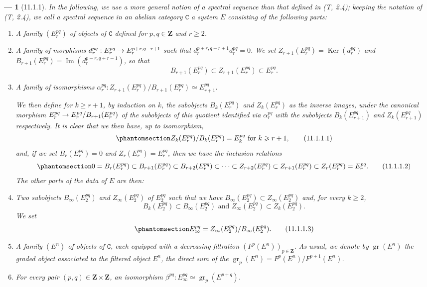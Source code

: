 \documentclass[oneside]{amsart}
\theoremstyle{ega-env-style}
\newtheorem*{env}{---}
\theoremstyle{ega-thm-env-style}
\theoremstyle{ega-defn-env-style}
\def\bb{\mathbf}                    %
\def\cat{\mathtt}                   %
\def\geq{\geqslant}                 %
\def\gr{\operatorname{gr}}
\def\Ker{\operatorname{Ker}}
\def\Im{\operatorname{Im}}
\renewcommand{\to}{\mathchoice{\longrightarrow}{\rightarrow}{\rightarrow}{\rightarrow}}
\def\isoto{\simeq} %
\newcommand{\oldpage}[2][]{{\marginnote{\normalfont{\textbf{#1}~|~#2}}}\ignorespaces}
\let\EGAOriginalLabel\label
\renewcommand{\label}[1]{\phantomsection\EGAOriginalLabel{#1}}
\begin{document}
\begin{env}[11.1.1]
\label{0.11.1.1}
In the following, we use a more general notion of a spectral sequence than that defined in (T, 2.4); keeping the notation of (T, 2.4), we call a \emph{spectral sequence} in an abelian category $\cat{C}$ a system $E$ consisting of the following parts:
\begin{enumerate}
  \item[(a)] A family $(E_r^{pq})$ of objects of $\cat{C}$ defined for $p,q\in\bb{Z}$ and $r\geq 2$.
  \item[(b)] A family of morphisms $d_r^{pq}:E_r^{pq}\to E_r^{p+r,q-r+1}$ such that $d_r^{p+r,q-r+1}d_r^{pq}=0$.
    We set $Z_{r+1}(E_r^{pq})=\Ker(d_r^{pq})$ and $B_{r+1}(E_r^{pq})=\Im(d_r^{p-r,q+r-1})$, so that
    \[
      B_{r+1}(E_r^{pq})\subset Z_{r+1}(E_r^{pq})\subset E_r^{pq}.
    \]
  \item[(c)] A family of isomorphisms $\alpha_r^{pq}:Z_{r+1}(E_r^{pq})/B_{r+1}(E_r^{pq})\isoto E_{r+1}^{pq}$.

  We then define for $k\geq r+1$, by induction on $k$, the subobjects $B_k(E_r^{pq})$ and $Z_k(E_r^{pq})$ as the inverse images, under the canonical morphism $E_r^{pq}\to E_r^{pq}/B_{r+1}(E_r^{pq})$ of the subobjects of this quotient identified via $\alpha_r^{pq}$ with the subobjects $B_k(E_{r+1}^{pq})$ and $Z_k(E_{r+1}^{pq})$ respectively.
It is clear that we then have, up to isomorphism,
  \[
  \label{0.11.1.1.1}
    Z_k(E_r^{pq})/B_k(E_r^{pq})=E_k^{pq}\text{ for }k\geq r+1,
    \tag{11.1.1.1}
  \]
  and, if we set $B_r(E_r^{pq})=0$ and $Z_r(E_r^{pq})=E_r^{pq}$, then we have the inclusion relations
  \[
  \label{0.11.1.1.2}
    0=B_r(E_r^{pq})\subset B_{r+1}(E_r^{pq})\subset B_{r+2}(E_r^{pq})\subset\cdots\subset Z_{r+2}(E_r^{pq})\subset Z_{r+1}(E_r^{pq})\subset Z_r(E_r^{pq})=E_r^{pq}.
    \tag{11.1.1.2}
  \]
  The other parts of the data of $E$ are then:
  \item[(d)] Two subobjects $B_\infty(E_2^{pq})$ and $Z_\infty(E_2^{pq})$ of $E_2^{pq}$ such that we have $B_\infty(E_2^{pq})\subset Z_\infty(E_2^{pq})$ and, for every $k\geq 2$,
    \[
      B_k(E_2^{pq})\subset B_\infty(E_2^{pq})\text{ and }Z_\infty(E_2^{pq})\subset Z_k(E_2^{pq}).
    \]
    We set
    \[
    \label{0.11.1.1.3}
      E_\infty^{pq}=Z_\infty(E_2^{pq})/B_\infty(E_2^{pq}).
      \tag{11.1.1.3}
    \]
  \item[(e)]
\oldpage[0\textsubscript{III}]{24}
    A family $(E^n)$ of objects of $\cat{C}$, each equipped with a \emph{decreasing filtration $(F^p(E^n))_{p\in\bb{Z}}$}.
    As usual, we denote by $\gr(E^n)$ the graded object associated to the filtered object $E^n$, the direct sum of the $\gr_p(E^n)=F^p(E^n)/F^{p+1}(E^n)$.
  \item[(f)] For every pair $(p,q)\in\bb{Z}\times\bb{Z}$, an isomorphism $\beta^{pq}:E_\infty^{pq}\isoto\gr_p(E^{p+q})$.
\end{enumerate}


\end{env}
\end{document}
